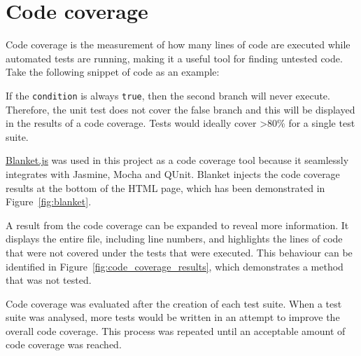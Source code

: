 % 	


\section{Code coverage} {
\label{sec:code_coverage}

	Code coverage is the measurement of how many lines of code are executed while automated tests are running, making it a useful tool for finding untested code. Take the following snippet of code as an example:

	

	If the \texttt{condition} is always \texttt{true}, then the second branch will never execute. Therefore, the unit test does not cover the false branch and this will be displayed in the results of a code coverage. Tests would ideally cover \textgreater80\% for a single test suite.

	\href{http://blanketjs.org/}{Blanket.js} was used in this project as a code coverage tool because it seamlessly integrates with Jasmine, Mocha and QUnit. Blanket injects the code coverage results at the bottom of the HTML page, which has been demonstrated in Figure~\ref{fig:blanket}.

	

	A result from the code coverage can be expanded to reveal more information. It displays the entire file, including line numbers, and highlights the lines of code that were not covered under the tests that were executed. This behaviour can be identified in Figure~\ref{fig:code_coverage_results}, which demonstrates a method that was not tested.

	

	Code coverage was evaluated after the creation of each test suite. When a test suite was analysed, more tests would be written in an attempt to improve the overall code coverage. This process was repeated until an acceptable amount of code coverage was reached.

}

